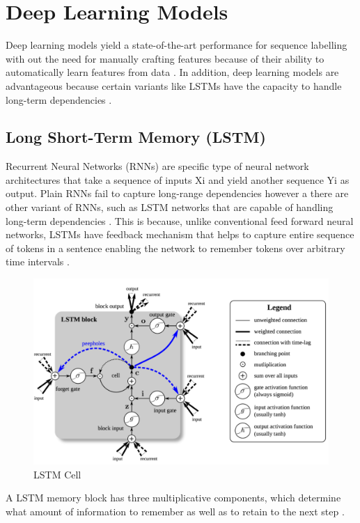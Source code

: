 \section{Deep Learning Models }
\label{sec:chapter05:MLModels:DLMs}

Deep learning models yield a state-of-the-art performance for sequence labelling with out the need for manually crafting features because of their ability to automatically learn features from data \citep{he2020survey}. In addition, deep learning models are advantageous because certain variants like LSTMs have the capacity to handle long-term dependencies \citep{akhundov2018sequence}. 



\subsection{Long Short-Term Memory (LSTM)}
\label{sec:chapter05:DLModels:LSTM}

Recurrent Neural Networks (RNNs) are specific type of neural network architectures that take a sequence of inputs Xi and yield another sequence Yi as output. Plain RNNs fail to capture long-range dependencies however a there are other variant of RNNs, such as LSTM networks that are capable of handling long-term dependencies \citep{akhundov2018sequence, lample2016neural}. This is because, unlike conventional feed forward neural networks, LSTMs have feedback mechanism that helps to capture entire sequence of tokens in a sentence enabling the network to remember tokens over arbitrary time intervals \citep{enwiki:1073570927}. \\

\begin{figure}[htbp]
	\centering
	\includegraphics[width=.66\textwidth]{4.graphics/figures/ch_5/pdf/LSTM_cell}
	\caption{LSTM Cell \citep{ma2016end}}
	\label{fig:chapter03:setup}
\end{figure}

A LSTM memory block has three multiplicative components, which determine what amount of information to remember as well as to retain to the next step \citep{ma2016end}. 


